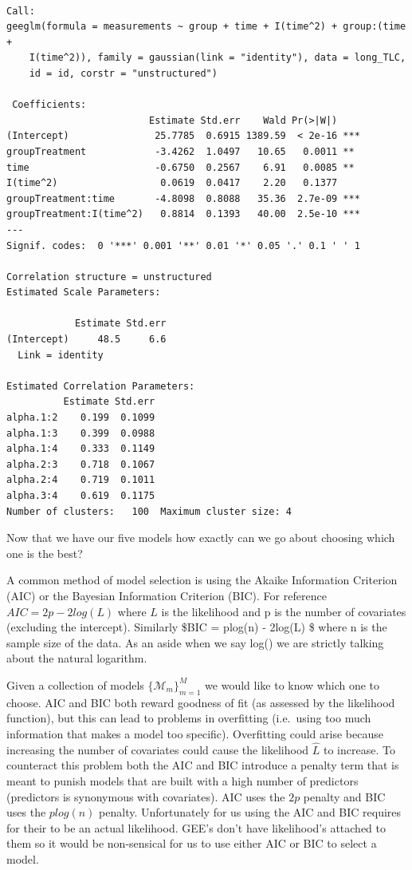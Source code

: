 \documentclass[
  letterpaper,
  DIV=11,
  numbers=noendperiod]{scrreprt}
\begin{document}
\begin{verbatim}

Call:
geeglm(formula = measurements ~ group + time + I(time^2) + group:(time + 
    I(time^2)), family = gaussian(link = "identity"), data = long_TLC, 
    id = id, corstr = "unstructured")

 Coefficients:
                         Estimate Std.err    Wald Pr(>|W|)    
(Intercept)               25.7785  0.6915 1389.59  < 2e-16 ***
groupTreatment            -3.4262  1.0497   10.65   0.0011 ** 
time                      -0.6750  0.2567    6.91   0.0085 ** 
I(time^2)                  0.0619  0.0417    2.20   0.1377    
groupTreatment:time       -4.8098  0.8088   35.36  2.7e-09 ***
groupTreatment:I(time^2)   0.8814  0.1393   40.00  2.5e-10 ***
---
Signif. codes:  0 '***' 0.001 '**' 0.01 '*' 0.05 '.' 0.1 ' ' 1

Correlation structure = unstructured 
Estimated Scale Parameters:

            Estimate Std.err
(Intercept)     48.5     6.6
  Link = identity 

Estimated Correlation Parameters:
          Estimate Std.err
alpha.1:2    0.199  0.1099
alpha.1:3    0.399  0.0988
alpha.1:4    0.333  0.1149
alpha.2:3    0.718  0.1067
alpha.2:4    0.719  0.1011
alpha.3:4    0.619  0.1175
Number of clusters:   100  Maximum cluster size: 4 
\end{verbatim}

Now that we have our five models how exactly can we go about choosing
which one is the best?

A common method of model selection is using the Akaike Information
Criterion (AIC) or the Bayesian Information Criterion (BIC). For
reference \(AIC = 2p - 2log(L)\) where \(L\) is the likelihood and p is
the number of covariates (excluding the intercept). Similarly \$BIC =
plog(n) - 2log(L) \$ where n is the sample size of the data. As an aside
when we say log() we are strictly talking about the natural logarithm.

Given a collection of models \(\{ \mathcal{M}_m \}^M_{m=1}\) we would
like to know which one to choose. AIC and BIC both reward goodness of
fit (as assessed by the likelihood function), but this can lead to
problems in overfitting (i.e.~using too much information that makes a
model too specific). Overfitting could arise because increasing the
number of covariates could cause the likelihood \(\hat{L}\) to increase.
To counteract this problem both the AIC and BIC introduce a penalty term
that is meant to punish models that are built with a high number of
predictors (predictors is synonymous with covariates). AIC uses the
\(2p\) penalty and BIC uses the \(plog(n)\) penalty. Unfortunately for
us using the AIC and BIC requires for their to be an actual likelihood.
GEE's don't have likelihood's attached to them so it would be
non-sensical for us to use either AIC or BIC to select a model.
\end{document}
